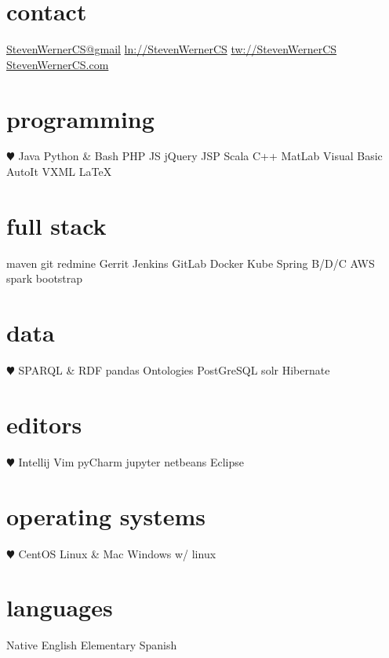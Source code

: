 \documentclass[]{friggeri-cv} %
\begin{document}


\begin{aside1} 
\section{contact}
\href{mailto:StevenWernerCS@gmail.com}{StevenWernerCS@gmail}
\href{http://linkedin.com/in/StevenWernerCS}{ln://StevenWernerCS}
\href{http://www.twitter.com/StevenWernerCS}{tw://StevenWernerCS}
\href{http://www.StevenWernerCS.com}{StevenWernerCS.com}
\section{programming}
{\color{red} $\varheartsuit$} Java Python \& Bash
PHP JS jQuery JSP
Scala C++ MatLab 
Visual Basic AutoIt 
VXML {\selectfont \LaTeX}
\section{full stack}
maven git
redmine Gerrit
Jenkins GitLab
Docker Kube
Spring B/D/C
AWS spark
bootstrap
\section{data}
{\color{red} $\varheartsuit$} SPARQL \& RDF
pandas
Ontologies
PostGreSQL
solr Hibernate
\section{editors}
{\color{red} $\varheartsuit$} Intellij Vim
pyCharm jupyter
netbeans Eclipse
\section{operating systems}
{\color{red} $\varheartsuit$} CentOS Linux \& Mac 
Windows w/ linux
\section{languages}
Native English
Elementary Spanish
\end{aside1}
\end{document}

